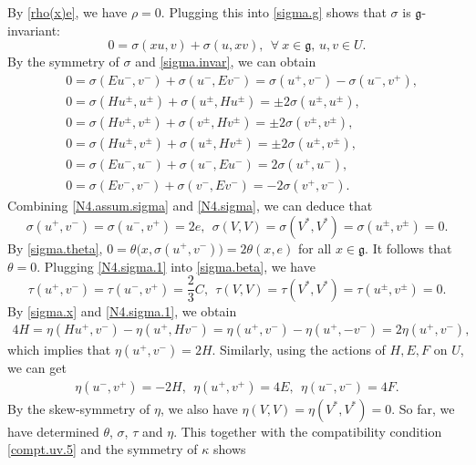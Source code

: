 \documentclass[12pt]{article}
\numberwithin{equation}{section}
\theoremstyle{definition}
\theoremstyle{plain}
\newcommand{\fg}{\mathfrak{g}}
\begin{document}
By \eqref{rho(x)e}, we have $\rho=0$. Plugging this into \eqref{sigma.g} shows that $\sigma$ is $\fg$-invariant:
\begin{equation}\label{sigma.invar}
    0=\sigma(xu,v)+\sigma(u,xv),\ \ \forall\ x\in\fg,\,u,v\in U.
\end{equation}
By the symmetry of $\sigma$ and \eqref{sigma.invar}, we can obtain
\begin{equation}\label{N4.sigma}
    \begin{split}
        &0=\sigma(Eu^-,v^-)+\sigma(u^-,Ev^-)=\sigma(u^+,v^-)-\sigma(u^-,v^+),\\
    &0=\sigma(Hu^\pm,u^\pm)+\sigma(u^\pm,Hu^\pm)=\pm2\sigma(u^\pm,u^\pm),\\
    &0=\sigma(Hv^\pm,v^\pm)+\sigma(v^\pm,Hv^\pm)=\pm2\sigma(v^\pm,v^\pm),\\
    &0=\sigma(Hu^\pm,v^\pm)+\sigma(u^\pm,Hv^\pm)=\pm2\sigma(u^\pm,v^\pm),\\
    &0=\sigma(Eu^-,u^-)+\sigma(u^-,Eu^-)=2\sigma(u^+,u^-),\\
    &0=\sigma(Ev^-,v^-)+\sigma(v^-,Ev^-)=-2\sigma(v^+,v^-).
    \end{split}
\end{equation}
Combining \eqref{N4.assum.sigma} and \eqref{N4.sigma}, we can deduce that
\begin{equation}\label{N4.sigma.1}
    \sigma(u^+,v^-)=\sigma(u^-,v^+)=2e,\ \ \sigma(V,V)=\sigma(V^*,V^*)=\sigma(u^\pm,v^\pm)=0.
\end{equation}
By \eqref{sigma.theta}, $0=\theta\big(x,\sigma(u^+,v^-)\big)=2\theta(x,e)$ for all $x\in\fg$. It follows that $\theta=0$. Plugging \eqref{N4.sigma.1} into \eqref{sigma.beta}, we have
\begin{equation*}
    \tau(u^+,v^-)=\tau(u^-,v^+)=\frac{2}{3}C,\ \ \tau(V,V)=\tau(V^*,V^*)=\tau(u^\pm,v^\pm)=0.
\end{equation*}
By \eqref{sigma.x} and \eqref{N4.sigma.1}, we obtain
\begin{align*}
    4H=\eta(Hu^+,v^-)-\eta(u^+,Hv^-)=\eta(u^+,v^-)-\eta(u^+,-v^-)=2\eta(u^+,v^-),
\end{align*}
which implies that $\eta(u^+,v^-)=2H$. Similarly, using the actions of $H,E,F$ on $U$, we can get
\begin{gather*}
    \eta(u^-,v^+)=-2H,\ \ \eta(u^+,v^+)=4E,\ \ \eta(u^-,v^-)=4F.
\end{gather*}
By the skew-symmetry of $\eta$, we also have $\eta(V,V)=\eta(V^*,V^*)=0$. So far, we have determined $\theta$, $\sigma$, $\tau$ and $\eta$. This together with the compatibility condition \eqref{compt.uv.5} and the symmetry of $\kappa$ shows
\end{document}
